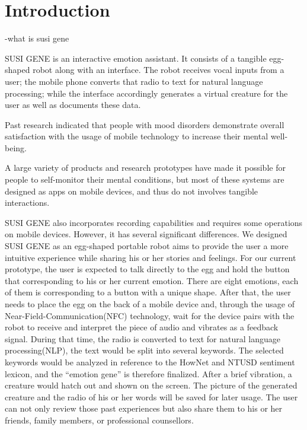 \documentclass[manuscript,screen]{acmart}
\begin{document}
\maketitle

\section{Introduction}

-what is susi gene

SUSI GENE is an interactive emotion assistant.  It consists of a tangible egg-shaped robot along with an interface. The robot receives vocal inputs from a user; the mobile phone converts that radio to text for natural language processing; while the interface accordingly generates a virtual creature for the user as well as documents these data.

Past research indicated that people with mood disorders demonstrate overall satisfaction with the usage of mobile technology to increase their mental well-being.\cite{proudfoot2010community}

A large variety of products and research prototypes have made it possible for people to self-monitor their mental conditions, but most of these systems are designed as apps on mobile devices, and thus do not involves tangible interactions.

SUSI GENE also incorporates recording capabilities and requires some operations on mobile devices. However, it has several significant differences. We designed SUSI GENE as an egg-shaped portable robot aims to provide the user a more intuitive experience while sharing his or her stories and feelings. For our current prototype, the user is expected to talk directly to the egg and hold the button that corresponding to his or her current emotion. There are eight emotions, each of them is corresponding to a button with a unique shape. After that, the user needs to place the egg on the back of a mobile device and, through the usage of Near-Field-Communication(NFC) technology, wait for the device pairs with the robot to receive and interpret the piece of audio and vibrates as a feedback signal. During that time, the radio is converted to text for natural language processing(NLP), the text would be split into several keywords. The selected keywords would be analyzed in reference to the HowNet and NTUSD sentiment lexicon, and the “emotion gene” is therefore finalized. After a brief vibration, a creature would hatch out and shown on the screen. The picture of the generated creature and the radio of his or her words will be saved for later usage. The user can not only review those past experiences but also share them to his or her friends, family members, or professional counsellors.
\end{document}
